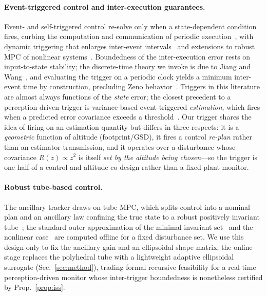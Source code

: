 \paragraph*{Event-triggered control and inter-execution guarantees.}
Event- and self-triggered control re-solve only when a state-dependent condition
fires, curbing the computation and communication of periodic
execution~\cite{tabuada2007event,heemels2012introduction}, with dynamic triggering that
enlarges inter-event intervals~\cite{girard2015dynamic} and extensions to robust MPC of
nonlinear systems~\cite{eqtami2010event,li2014event}. Boundedness of the inter-execution
error rests on input-to-state stability; the discrete-time theory we invoke is due to
Jiang and Wang~\cite{jiangwang2001}, and evaluating the trigger on a periodic clock
yields a minimum inter-event time by construction, precluding Zeno
behavior~\cite{heemelsdonkersteel2013}. Triggers in this literature are almost always
functions of the \emph{state} error; the closest precedent to a perception-driven
trigger is variance-based event-triggered \emph{estimation}, which fires when a
predicted error covariance exceeds a threshold~\cite{trimpe2014event}. Our trigger
shares the idea of firing on an estimation quantity but differs in three respects: it
is a \emph{geometric} function of altitude (footprint/GSD), it fires a control
\emph{re-plan} rather than an estimator transmission, and it operates over a
disturbance whose covariance $R(z)\propto z^{2}$ is itself \emph{set by the altitude
being chosen}---so the trigger is one half of a control-and-altitude co-design rather
than a fixed-plant monitor.

\paragraph*{Robust tube-based control.}
The ancillary tracker draws on tube MPC, which splits control into a nominal plan and
an ancillary law confining the true state to a robust positively invariant
tube~\cite{mayne2005robust,langson2004tubes,chisci2001persistent}; the standard outer
approximation of the minimal invariant set~\cite{mRPI} and the nonlinear
case~\cite{mayne2011tube} are computed offline for a fixed disturbance set. We use this
design only to fix the ancillary gain and an ellipsoidal shape matrix; the online stage
replaces the polyhedral tube with a lightweight adaptive ellipsoidal surrogate
(Sec.~\ref{sec:method}), trading formal recursive feasibility for a real-time
perception-driven monitor whose inter-trigger boundedness is nonetheless certified by
Prop.~\ref{prop:iss}.

